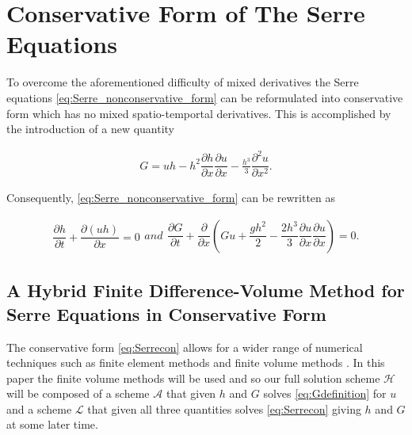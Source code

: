 \documentclass[SingleSpace,12pt,Proceedings]{Serre_ASCE}
\begin{document}
\section{Conservative Form of The Serre Equations}
To overcome the aforementioned difficulty of mixed derivatives the Serre equations \eqref{eq:Serre_nonconservative_form} can be reformulated into conservative form which has no mixed spatio-temportal derivatives. This is accomplished by the introduction of a new quantity \cite{Hank-etal-2010-2034,Zoppou-2014}
\begin{linenomath*}
\begin{gather}
\label{eq:Gdefinition}
G = uh - h^2 \dfrac{\partial h}{\partial x} \dfrac{\partial u}{\partial x} - \frac{h^3}{3} \dfrac{\partial^2 u}{\partial x^2}.
\end{gather}
\end{linenomath*}
Consequently, \eqref{eq:Serre_nonconservative_form} can be rewritten as
\begin{linenomath*}
\begin{subequations}
\begin{gather}
\dfrac{\partial h}{\partial t} + \dfrac{\partial (uh)}{\partial x} = 0
\label{eq:Serrecon_continuity}
\end{gather}
and
\begin{gather}
\dfrac{\partial G}{\partial t} + \dfrac{\partial}{\partial x}\left(Gu + \dfrac{gh^2}{2} - \dfrac{2h^3}{3}\dfrac{\partial u}{\partial x}\dfrac{\partial u}{\partial x}\right) = 0.
\label{eq:Serrecon_momentum}
\end{gather}
\label{eq:Serrecon}
\end{subequations}
\end{linenomath*}

\subsection{A Hybrid Finite Difference-Volume Method for Serre Equations in Conservative Form}
\label{section:hybridmethod}
The conservative form \eqref{eq:Serrecon} allows for a wider range of numerical techniques such as finite element methods \cite{Guyenne-etal-2014-169} and finite volume methods \cite{Hank-etal-2010-2034,Zoppou-2014}. In this paper the finite volume methods will be used and so our full solution scheme $\mathcal{H}$ will be composed of a scheme $\mathcal{A}$ that given $h$ and $G$ solves \eqref{eq:Gdefinition} for $u$ and a scheme $\mathcal{L}$ that given all three quantities solves \eqref{eq:Serrecon} giving $h$ and $G$ at some later time. 
\end{document}
